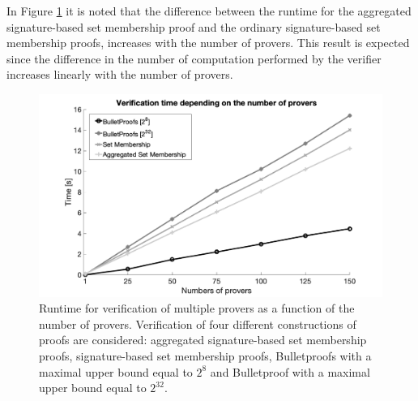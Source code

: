 In Figure \ref{fig:NrClients} it is noted that the difference between the runtime for the aggregated signature-based set membership proof and the ordinary signature-based set membership proofs, increases with the number of provers. This result is expected since the difference in the number of computation performed by the verifier increases linearly with the number of provers. 




 \begin{figure}[]
\includegraphics[width=\linewidth]{./figure/verificationNbrClients.png}
\caption{Runtime for verification of multiple provers as a function of the number of provers. Verification of four different constructions of proofs  are considered: aggregated signature-based set membership proofs, signature-based set membership proofs, Bulletproofs with a maximal upper bound equal to $2^8$ and Bulletproof with a maximal upper bound equal  to $2^{32}$.}
\label{fig:NrClients}
\end{figure}
